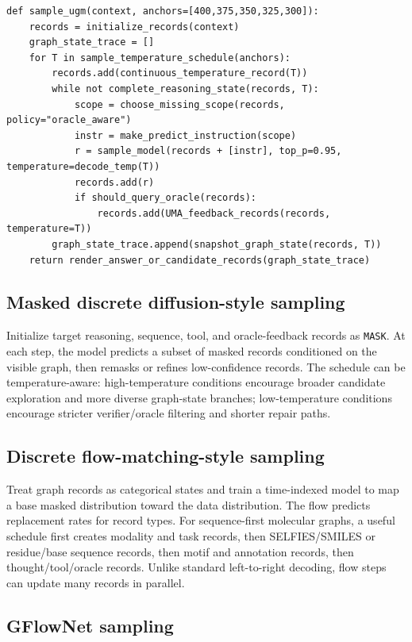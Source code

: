 \documentclass[11pt]{article}
\newcommand{\1}{\mathbf{1}}
\begin{document}
\begin{lstlisting}[caption={Continuous-temperature random-order sampler.}]
def sample_ugm(context, anchors=[400,375,350,325,300]):
    records = initialize_records(context)
    graph_state_trace = []
    for T in sample_temperature_schedule(anchors):
        records.add(continuous_temperature_record(T))
        while not complete_reasoning_state(records, T):
            scope = choose_missing_scope(records, policy="oracle_aware")
            instr = make_predict_instruction(scope)
            r = sample_model(records + [instr], top_p=0.95, temperature=decode_temp(T))
            records.add(r)
            if should_query_oracle(records):
                records.add(UMA_feedback_records(records, temperature=T))
        graph_state_trace.append(snapshot_graph_state(records, T))
    return render_answer_or_candidate_records(graph_state_trace)
\end{lstlisting}

\subsection{Masked discrete diffusion-style sampling}

Initialize target reasoning, sequence, tool, and oracle-feedback records as \texttt{MASK}. At each step, the model predicts a subset of masked records conditioned on the visible graph, then remasks or refines low-confidence records. The schedule can be temperature-aware: high-temperature conditions encourage broader candidate exploration and more diverse graph-state branches; low-temperature conditions encourage stricter verifier/oracle filtering and shorter repair paths.

\subsection{Discrete flow-matching-style sampling}

Treat graph records as categorical states and train a time-indexed model to map a base masked distribution toward the data distribution. The flow predicts replacement rates for record types. For sequence-first molecular graphs, a useful schedule first creates modality and task records, then SELFIES/SMILES or residue/base sequence records, then motif and annotation records, then thought/tool/oracle records. Unlike standard left-to-right decoding, flow steps can update many records in parallel.

\subsection{GFlowNet sampling}
\end{document}
